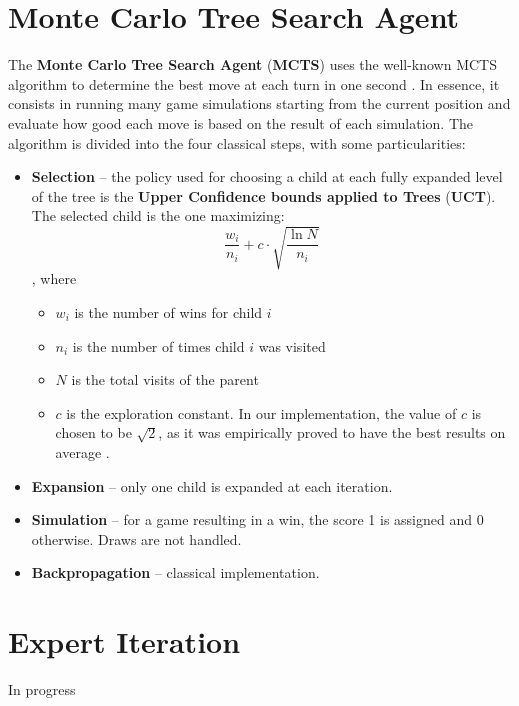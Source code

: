 \section{Monte Carlo Tree Search Agent}

The \textbf{Monte Carlo Tree Search Agent} (\textbf{MCTS}) uses the well-known MCTS algorithm to determine the best move at each turn in one second \cite{alpha_beta}. In essence, it consists in running many game simulations starting from the current position and evaluate how good each move is based on the result of each simulation. The algorithm is divided into the four classical steps, with some particularities:

\begin{itemize}
    \item \textbf{Selection} -- the policy used for choosing a child at each fully expanded level of the tree is the \textbf{Upper Confidence bounds applied to Trees} (\textbf{UCT}). The selected child is the one maximizing:
    \[ \frac{w_i}{n_i} + c \cdot \sqrt{\frac{\ln{N}}{n_i}} \],
    where
    \begin{itemize}
        \item $w_i$ is the number of wins for child $i$
        \item $n_i$ is the number of times child $i$ was visited
        \item $N$ is the total visits of the parent
        \item $c$ is the exploration constant. In our implementation, the value of $c$ is chosen to be $\sqrt{2}$, as it was empirically proved to have the best results on average \cite{sqrt_2_constant}.
    \end{itemize}
    \item \textbf{Expansion} -- only one child is expanded at each iteration.
    \item \textbf{Simulation} -- for a game resulting in a win, the score 1 is assigned and 0 otherwise. Draws are not handled.
    \item \textbf{Backpropagation} -- classical implementation.
\end{itemize}

\section{Expert Iteration}

In progress